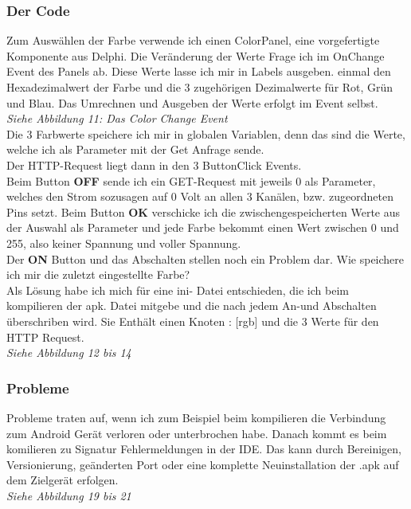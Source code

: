 \subsubsection{Der Code}
Zum Auswählen der Farbe verwende ich einen ColorPanel, eine vorgefertigte Komponente aus Delphi. Die Veränderung der Werte Frage ich im OnChange Event des Panels ab. Diese Werte lasse ich mir in Labels ausgeben. einmal den Hexadezimalwert der Farbe und die 3 zugehörigen Dezimalwerte für Rot, Grün und Blau. Das Umrechnen und Ausgeben der Werte erfolgt im Event selbst.\\
\textit{Siehe Abbildung 11: Das Color Change Event}\\
Die 3 Farbwerte speichere ich mir in globalen Variablen, denn das sind die Werte, welche ich als Parameter mit der Get Anfrage sende.\\
Der HTTP-Request liegt dann in den 3 ButtonClick Events.\\
Beim Button \textbf{OFF} sende ich ein GET-Request mit jeweils 0 als Parameter, welches den Strom sozusagen auf 0 Volt an allen 3 Kanälen, bzw. zugeordneten Pins setzt.
Beim Button \textbf{OK} verschicke ich die zwischengespeicherten Werte aus der Auswahl als Parameter und jede Farbe bekommt einen Wert zwischen 0 und 255, also keiner Spannung und voller Spannung.\\
Der \textbf{ON} Button und das Abschalten stellen noch ein Problem dar. Wie speichere ich mir die zuletzt eingestellte Farbe?\\
Als Lösung habe ich mich für eine ini- Datei entschieden, die ich beim kompilieren der apk. Datei mitgebe und die nach jedem An-und Abschalten überschriben wird. Sie Enthält einen Knoten : [rgb] und die 3 Werte für den HTTP Request.\\
\textit{Siehe Abbildung 12 bis 14}
\subsubsection{Probleme}
Probleme traten auf, wenn ich zum Beispiel beim kompilieren die Verbindung zum Android Gerät verloren oder unterbrochen habe. Danach kommt es beim komilieren zu Signatur Fehlermeldungen in der IDE. Das kann durch Bereinigen, Versionierung, geänderten Port oder eine komplette Neuinstallation der .apk auf dem Zielgerät erfolgen.\\
\textit{Siehe Abbildung 19 bis 21}




